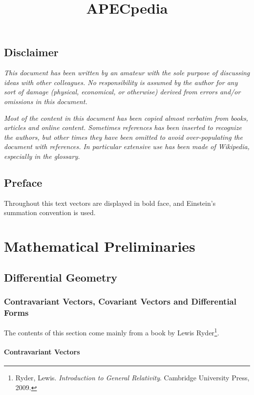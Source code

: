\documentclass[english, 12pt]{book}
\title{APECpedia}
\begin{document}
\maketitle

\tableofcontents
{}


\chapter*{Disclaimer} \nonumber
\emph{This document has been written by an amateur with the sole purpose of discussing ideas with other colleagues. No responsibility is assumed by the author for any sort of damage (physical, economical, or otherwise) derived from errors and/or omissions in this document.}

\emph{Most of the content in this document has been copied almost verbatim from books, articles and online content. Sometimes references has been inserted to recognize the authors, but other times they have been omitted to avoid over-populating the document with references. In particular extensive use has been made of Wikipedia, especially in the glossary.}


\chapter*{Preface} \nonumber

Throughout this text vectors are displayed in bold face, and Einstein's summation convention is used.


\part{Mathematical Preliminaries}

\chapter{Differential Geometry}

\section{Contravariant Vectors, Covariant Vectors and Differential Forms}

The contents of this section come mainly from a book by Lewis Ryder\footnote{Ryder, Lewis. \emph{Introduction to General Relativity}. Cambridge University Press, 2009.}.


\subsection{Contravariant Vectors}
\end{document}
